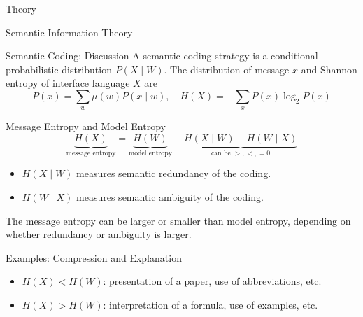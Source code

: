 \documentclass[presentation,mathserif,9pt]{beamer}
\begin{document}
\begin{section}{Theory}
\begin{subsection}{Semantic Information Theory}
		\begin{frame}{Semantic Coding: Discussion}
			A {\color{blue} semantic coding} strategy is a conditional probabilistic distribution $P(X \mid W)$.
			\singlespacing
			The distribution of message $x$ and Shannon entropy of interface language $X$ are
			\begin{equation}
				P(x) = \sum_{w} \mu(w) P(x \mid w), \quad H(X) = -\sum_{x} P(x) \log_2 P(x)
			\end{equation}
			\vspace{-0.3cm}
			\begin{block}{Message Entropy and Model Entropy}
				\begin{equation}
					\underbrace{H(X)}_{\text{message entropy}} = \underbrace{H(W)}_{\text{model entropy}} + \underbrace{H(X \mid W) - H(W \mid X)}_{\text{can be } >, <, = 0}
				\end{equation}
				\vspace{-0.3cm}
				\begin{itemize}
					\item $H(X \mid W)$ measures {\color{blue} semantic redundancy} of the coding.
					\item $H(W \mid X)$ measures {\color{blue} semantic ambiguity} of the coding.
				\end{itemize}
				The message entropy can be larger or smaller than model entropy, depending on whether redundancy or ambiguity is larger.
			\end{block}
			\begin{exampleblock}{Examples: Compression and Explanation}
				\begin{itemize}
					\item $H(X) < H(W)$: presentation of a paper, use of abbreviations, etc.
					\item $H(X) > H(W)$: interpretation of a formula, use of examples, etc.
				\end{itemize}
			\end{exampleblock}
		\end{frame}


\end{subsection}
\end{section}
\end{document}
